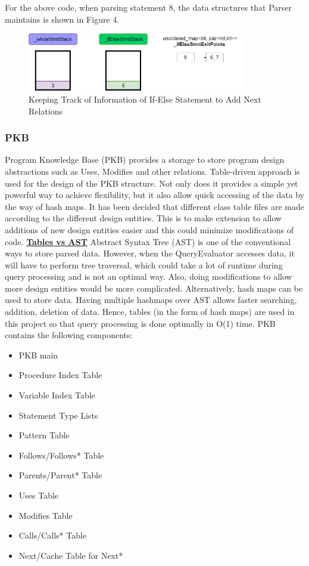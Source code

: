 \documentclass[12pt]{article}
\begin{document}
For the above code, when parsing statement 8, the data structures that Parser maintains is shown in Figure 4.
\begin{figure}[htbp]
  \caption{Keeping Track of Information of If-Else Statement to Add Next Relations
}
  \centering
    \includegraphics[width=0.85\textwidth]{Parser_AddNextRelationToPKB.png}
\end{figure}
\subsubsection{PKB}
Program Knowledge Base (PKB) provides a storage to store program design abstractions such as Uses, Modifies and other relations. Table-driven approach is used for the design of the PKB structure. Not only does it provides a simple yet powerful way to achieve flexibility, but it also allow quick accessing of the data by the way of hash maps. It has been decided that different class table files are made according to the different design entities. This is to make extension to allow additions of new design entities easier and this could minimize modifications of code.
\newline \textbf{\underline{Tables vs AST}}
\newline Abstract Syntax Tree (AST) is one of the conventional ways to store parsed data. However, when  the QueryEvaluator accesses data, it will have to perform tree traversal, which could take a lot of runtime during query processing and is not an optimal way. Also, doing modifications to allow more design entities would be more complicated. Alternatively, hash maps can be used to store data. Having multiple hashmaps over AST allows faster searching, addition, deletion of data.
\newline Hence, tables (in the form of hash maps) are used in this project so that query processing is done optimally in O(1) time. \newline
PKB contains the following components:
\begin{itemize}
\item PKB main 
\item Procedure Index Table
\item Variable Index Table
\item Statement Type Lists
\item Pattern Table
\item Follows/Follows* Table
\item Parents/Parent* Table
\item Uses Table
\item Modifies Table
\item Calls/Calls* Table
\item Next/Cache Table for Next*

\end{itemize}
\end{document}
